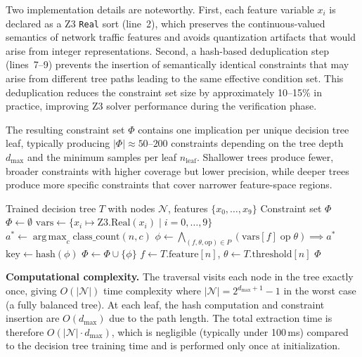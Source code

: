 \documentclass[12pt, letterpaper, oneside]{report}
\newcommand{\argmax}{\operatorname*{arg\,max}}
\begin{document}
Two implementation details are noteworthy. First, each feature variable $x_i$ is declared as a Z3 \texttt{Real} sort (line~2), which preserves the continuous-valued semantics of network traffic features and avoids quantization artifacts that would arise from integer representations. Second, a hash-based deduplication step (lines~7--9) prevents the insertion of semantically identical constraints that may arise from different tree paths leading to the same effective condition set. This deduplication reduces the constraint set size by approximately 10--15\% in practice, improving Z3 solver performance during the verification phase.

The resulting constraint set $\Phi$ contains one implication per unique decision tree leaf, typically producing $|\Phi| \approx 50$--$200$ constraints depending on the tree depth $d_{\max}$ and the minimum samples per leaf $n_{\text{leaf}}$. Shallower trees produce fewer, broader constraints with higher coverage but lower precision, while deeper trees produce more specific constraints that cover narrower feature-space regions.

\begin{algorithm}[htbp]
\caption{Z3 Constraint Extraction from Decision Tree}
\label{alg:z3_extract}
\begin{algorithmic}[1]
\Require Trained decision tree $T$ with nodes $\mathcal{N}$, features $\{x_0, \ldots, x_9\}$
\Ensure Constraint set $\Phi$
\State $\Phi \leftarrow \emptyset$
\State $\text{vars} \leftarrow \{x_i \mapsto \text{Z3.Real}(x_i) \mid i = 0, \ldots, 9\}$
        \State $a^* \leftarrow \argmax_c \text{class\_count}(n, c)$  
        \State $\phi \leftarrow \bigwedge_{(f, \theta, \text{op}) \in P} (\text{vars}[f] \;\text{op}\; \theta) \implies a^*$
        \State $\text{key} \leftarrow \text{hash}(\phi)$
            \State $\Phi \leftarrow \Phi \cup \{\phi\}$
        \EndIf
    \Else
        \State $f \leftarrow T.\text{feature}[n]$, \quad $\theta \leftarrow T.\text{threshold}[n]$
        \State {}
        \State {}
    \EndIf
\EndProcedure
\State {}
\State \Return $\Phi$
\end{algorithmic}
\end{algorithm}

\textbf{Computational complexity.} The traversal visits each node in the tree exactly once, giving $O(|\mathcal{N}|)$ time complexity where $|\mathcal{N}| = 2^{d_{\max}+1} - 1$ in the worst case (a fully balanced tree). At each leaf, the hash computation and constraint insertion are $O(d_{\max})$ due to the path length. The total extraction time is therefore $O(|\mathcal{N}| \cdot d_{\max})$, which is negligible (typically under 100\,ms) compared to the decision tree training time and is performed only once at initialization.
\end{document}
